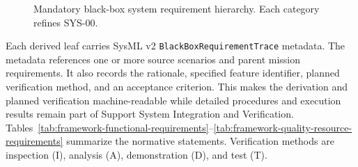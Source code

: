 \documentclass[11pt,a4paper]{article}
\begin{document}
\begin{figure}[H]
    \centering
    \resizebox{\linewidth}{!}{}
    \caption{Mandatory black-box system requirement hierarchy. Each category refines SYS-00.}
    \label{fig:framework-system-requirements}
\end{figure}

Each derived leaf carries SysML v2 \texttt{BlackBoxRequirementTrace} metadata. The metadata references one or more source scenarios and parent mission requirements. It also records the rationale, specified feature identifier, planned verification method, and an acceptance criterion. This makes the derivation and planned verification machine-readable while detailed procedures and execution results remain part of Support System Integration and Verification. Tables~\ref{tab:framework-functional-requirements}--\ref{tab:framework-quality-resource-requirements} summarize the normative statements. Verification methods are inspection (I), analysis (A), demonstration (D), and test (T).
\end{document}
